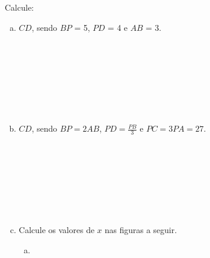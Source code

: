 \documentclass[a4paper,14pt]{article}
\begin{document}
\begin{multicols}{2}
\begin{enumerate}
    		Calcule:
    		\begin{enumerate}[a)]
    			\item $CD$, sendo $BP$ = 5, $PD$ = 4 e $AB$ = 3. \\\\\\\\\\\\\\\\
    			\item $CD$, sendo $BP = 2AB$, $PD = \frac{PB}{3}$ e $PC = 3PA = 27.$ \\\\\\\\\\\\\\\\
    			\item Calcule os valores de $x$ nas figuras a seguir.
    			\begin{enumerate}[a)]
    				\item $~$\\

\end{enumerate}
\end{enumerate}
\end{enumerate}
\end{multicols}
\end{document}
